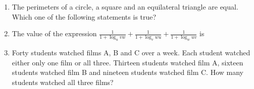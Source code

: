 \documentclass[journal,12pt,onecolumn]{IEEEtran}
\theoremstyle{remark}
\begin{document}
\begin{enumerate}
\hfill{}

\begin{enumerate}
\end{enumerate}

\item The perimeters of a circle, a square and an equilateral triangle are equal. Which one of the following statements is true?

\hfill{}

\begin{enumerate}
\end{enumerate}

\item The value of the expression $\frac{1}{1+\log_{u} vw} + \frac{1}{1+\log_{v} wu} + \frac{1}{1+\log_{w} uv}$ is

\hfill{}

\begin{enumerate}
\end{enumerate}

\item Forty students watched films A, B and C over a week. Each student watched either only one film or all three. Thirteen students watched film A, sixteen students watched film B and nineteen students watched film C. How many students watched all three films?

\hfill{}


\end{enumerate}
\end{document}
